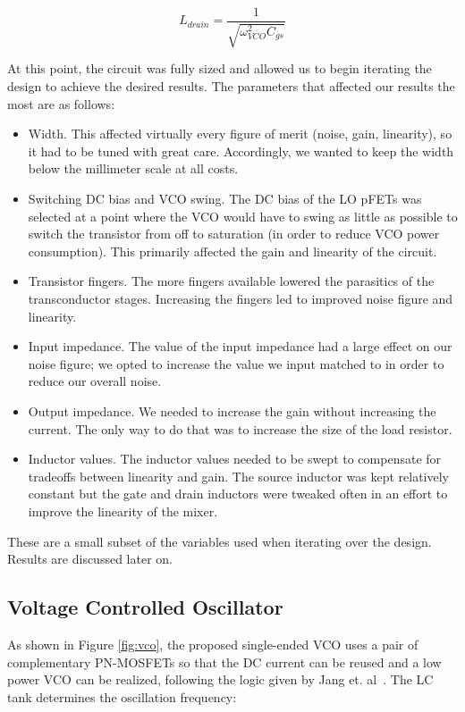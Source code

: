 \begin{equation}
L_{drain} = \frac{1}{\sqrt{\omega^{2}_{VCO}C_{gs}}}
\end{equation}

At this point, the circuit was fully sized and allowed us to begin iterating the design to achieve the desired results.
The parameters that affected our results the most are as follows:

\begin{itemize}
	\item Width. This affected virtually every figure of merit (noise, gain, linearity), so it had to be tuned with great care. Accordingly, we wanted to keep the width below the millimeter scale at all costs.
	\item Switching DC bias and VCO swing. The DC bias of the LO pFETs was selected at a point where the VCO would have to swing as little as possible to switch the transistor from off to saturation (in order to reduce VCO power consumption). This primarily affected the gain and linearity of the circuit.
	\item Transistor fingers. The more fingers available lowered the parasitics of the transconductor stages. Increasing the fingers led to improved noise figure and linearity.
	\item Input impedance. The value of the input impedance had a large effect on our noise figure; we opted to increase the value we input matched to in order to reduce our overall noise.
	\item Output impedance. We needed to increase the gain without increasing the current. The only way to do that was to increase the size of the load resistor.
	\item Inductor values. The inductor values needed to be swept to compensate for tradeoffs between linearity and gain. The source inductor was kept relatively constant but the gate and drain inductors were tweaked often in an effort to improve the linearity of the mixer.
\end{itemize}

These are a small subset of the variables used when iterating over the design. Results are discussed later on.

\subsection{Voltage Controlled Oscillator}
As shown in Figure \ref{fig:vco}, the proposed single-ended VCO uses a pair of complementary PN-MOSFETs so that the DC current can be reused and a low power VCO can be realized, following the logic given by Jang et. al~\cite{vco}. The LC tank determines the oscillation frequency:

